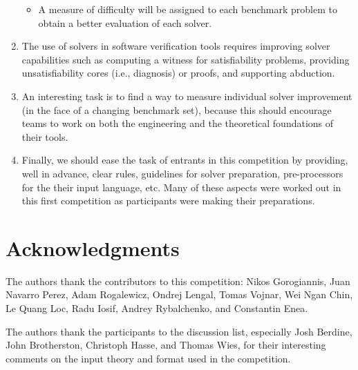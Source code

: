 \documentclass[twoside,11pt]{article}
\begin{document}
\begin{enumerate}
\begin{itemize}
\item A measure of difficulty will be assigned to each benchmark problem to obtain a better evaluation of each solver.
%
\end{itemize}

\item The use of solvers in software verification tools requires improving solver capabilities such as
computing a witness for satisfiability problems,
providing unsatisfiability cores (i.e., diagnosis) or proofs,
and supporting abduction.

\item An interesting task is to find a way to measure individual solver improvement (in the face of a changing benchmark set), because this should encourage teams to work on both the engineering and the theoretical foundations of their tools.
% 

\item Finally, we should ease the task of entrants in this competition by providing, well in advance, clear rules, guidelines for solver preparation, pre-processors for the their input language, etc. Many of these aspects were worked out in this first competition as participants were making their preparations.

\end{enumerate}


\section*{Acknowledgments}

The authors thank the contributors to this competition:
Nikos Gorogiannis, 
Juan Navarro Perez, 
Adam Rogalewicz, Ondrej Lengal, Tomas Vojnar, 
Wei Ngan Chin, Le Quang Loc, 
Radu Iosif, 
Andrey Rybalchenko, and
Constantin Enea.

The authors thank the participants to the discussion list, especially 
Josh Berdine, John Brotherston, Christoph Hasse, and Thomas Wies, 
for their interesting comments on the input theory and format used in the competition.
\end{document}
